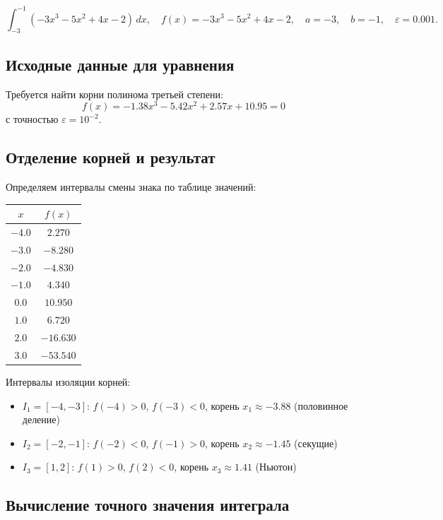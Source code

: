 \documentclass[a4paper,12pt]{article}
\begin{document}
\[
\int_{-3}^{-1} (-3x^3 - 5x^2 + 4x - 2)\,dx,
\quad f(x) = -3x^3 - 5x^2 + 4x - 2,
\quad a=-3,
\quad b=-1,
\quad \varepsilon=0.001.
\]

\subsection{Исходные данные для уравнения}

Требуется найти корни полинома третьей степени:
\[
    f(x) = -1.38x^3 - 5.42x^2 + 2.57x + 10.95 = 0
\]
с точностью $\varepsilon = 10^{-2}$.

\subsection{Отделение корней и результат}

Определяем интервалы смены знака по таблице значений:

\begin{center}
\begin{tabular}{|c|c|}
\hline
$x$ & $f(x)$ \\
\hline
$-4.0$ & $2.270$ \\
$-3.0$ & $-8.280$ \\
$-2.0$ & $-4.830$ \\
$-1.0$ & $4.340$ \\
$0.0$ & $10.950$ \\
$1.0$ & $6.720$ \\
$2.0$ & $-16.630$ \\
$3.0$ & $-53.540$ \\
\hline
\end{tabular}
\end{center}

Интервалы изоляции корней:
\begin{itemize}
    \item $I_1=[-4,-3]$: $f(-4)>0$, $f(-3)<0$, корень $x_1\approx-3.88$ (половинное деление)

    \item $I_2=[-2,-1]$: $f(-2)<0$, $f(-1)>0$, корень $x_2\approx-1.45$ (секущие)

    \item $I_3=[1,2]$: $f(1)>0$, $f(2)<0$, корень $x_3\approx1.41$ (Ньютон)
\end{itemize}


\subsection{Вычисление точного значения интеграла}
\end{document}
